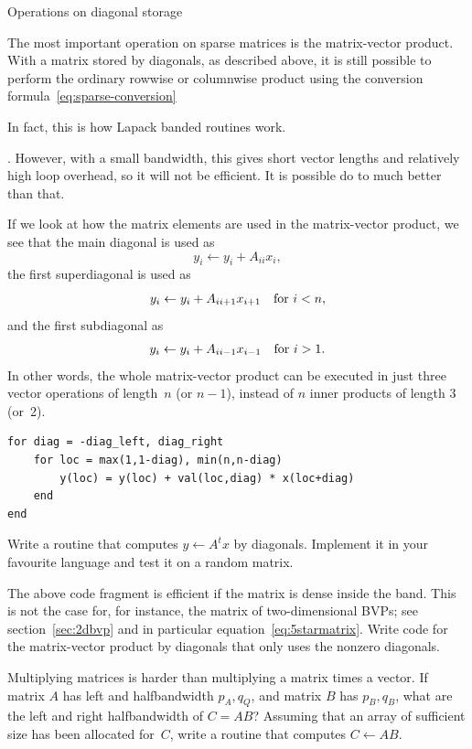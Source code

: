  {Operations on diagonal storage}

The most important operation on sparse matrices is the matrix-vector
product. With a matrix stored by diagonals, as described above, it is
still possible to perform the ordinary rowwise or columnwise product using the
conversion formula~\eqref{eq:sparse-conversion}
\begin{footnoteenv}
  {In fact,
    this is how Lapack banded routines work.}
\end{footnoteenv}%
.
%
However, with
a small bandwidth, this gives short vector lengths and relatively high
loop overhead, so it will not be efficient. It is possible do to much
better than that.

If we look at how the matrix elements are used in the matrix-vector
product, we see that the main diagonal is used as
\[ y_i \leftarrow y_i + A_{ii} x_i, \]
the first superdiagonal is used as
\[ y_i \leftarrow y_i + A_{ii+1} x_{i+1}\quad\hbox{for $i<n$}, \]
and the first subdiagonal as
\[ y_i \leftarrow y_i + A_{ii-1} x_{i-1}\quad\hbox{for $i>1$}. \]
In other words, the whole matrix-vector product can be executed in
just three vector operations of length~$n$ (or $n-1$), instead of $n$
inner products of length 3 (or~2).

\begin{verbatim}
for diag = -diag_left, diag_right
    for loc = max(1,1-diag), min(n,n-diag)
        y(loc) = y(loc) + val(loc,diag) * x(loc+diag)
    end
end
\end{verbatim}

\begin{exercise}
  Write a routine that computes $y\leftarrow A^tx$ by
  diagonals. Implement it in your favourite language and test it on a
  random matrix.
\end{exercise}
\begin{exercise}
  The above code fragment is efficient if the matrix is dense inside
  the band. This is not the case for, for instance, the matrix of 
  two-dimensional \acp{BVP}; see section~\ref{sec:2dbvp} and in
  particular equation~\eqref{eq:5starmatrix}. Write code for the
  matrix-vector product by diagonals that only
  uses the nonzero diagonals.
\end{exercise}
\begin{exercise}
  Multiplying matrices is harder than multiplying a matrix times a
  vector. If matrix $A$ has left and halfbandwidth $p_A,q_Q$, and
  matrix $B$ has $p_B,q_B$, what are the left and right halfbandwidth
  of $C=AB$? Assuming that an array of sufficient size has been
  allocated for~$C$, write a routine that computes $C\leftarrow AB$.
\end{exercise}

